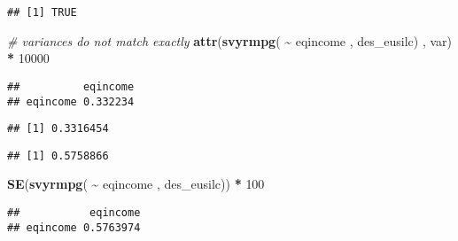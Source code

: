 \documentclass[
]{book}
\newenvironment{Shaded}{\begin{snugshade}}{\end{snugshade}}
\newcommand{\CommentTok}[1]{\textcolor[rgb]{0.56,0.35,0.01}{\textit{#1}}}
\newcommand{\DecValTok}[1]{\textcolor[rgb]{0.00,0.00,0.81}{#1}}
\newcommand{\FunctionTok}[1]{\textcolor[rgb]{0.13,0.29,0.53}{\textbf{#1}}}
\newcommand{\NormalTok}[1]{#1}
\newcommand{\SpecialCharTok}[1]{\textcolor[rgb]{0.81,0.36,0.00}{\textbf{#1}}}
\newcommand{\StringTok}[1]{\textcolor[rgb]{0.31,0.60,0.02}{#1}}
\begin{document}
\begin{verbatim}
## [1] TRUE
\end{verbatim}

\begin{Shaded}
\begin{Highlighting}[]
\CommentTok{\# variances do not match exactly}
\FunctionTok{attr}\NormalTok{(}\FunctionTok{svyrmpg}\NormalTok{( }\SpecialCharTok{\textasciitilde{}}\NormalTok{ eqincome , des\_eusilc) , }\StringTok{\textquotesingle{}var\textquotesingle{}}\NormalTok{) }\SpecialCharTok{*} \DecValTok{10000}
\end{Highlighting}
\end{Shaded}

\begin{verbatim}
##          eqincome
## eqincome 0.332234
\end{verbatim}

\begin{Shaded}
\end{Shaded}

\begin{verbatim}
## [1] 0.3316454
\end{verbatim}

\begin{Shaded}
\end{Shaded}

\begin{verbatim}
## [1] 0.5758866
\end{verbatim}

\begin{Shaded}
\begin{Highlighting}[]
\FunctionTok{SE}\NormalTok{(}\FunctionTok{svyrmpg}\NormalTok{( }\SpecialCharTok{\textasciitilde{}}\NormalTok{ eqincome , des\_eusilc)) }\SpecialCharTok{*} \DecValTok{100}
\end{Highlighting}
\end{Shaded}

\begin{verbatim}
##           eqincome
## eqincome 0.5763974
\end{verbatim}
\end{document}
